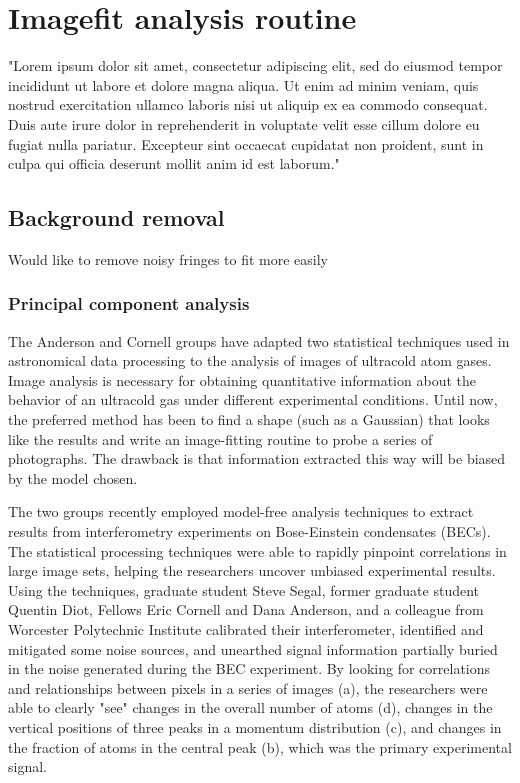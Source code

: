 \chapter{Imagefit analysis routine}
"Lorem ipsum dolor sit amet, consectetur adipiscing elit, sed do eiusmod tempor incididunt ut labore et dolore magna aliqua. Ut enim ad minim veniam, quis nostrud exercitation ullamco laboris nisi ut aliquip ex ea commodo consequat. Duis aute irure dolor in reprehenderit in voluptate velit esse cillum dolore eu fugiat nulla pariatur. Excepteur sint occaecat cupidatat non proident, sunt in culpa qui officia deserunt mollit anim id est laborum."

\section{Background removal}
Would like to remove noisy fringes to fit more easily

\subsection{Principal component analysis}

The Anderson and Cornell groups have adapted two statistical techniques used in astronomical data processing to the analysis of images of ultracold atom gases. Image analysis is necessary for obtaining quantitative information about the behavior of an ultracold gas under different experimental conditions. Until now, the preferred method has been to find a shape (such as a Gaussian) that looks like the results and write an image-fitting routine to probe a series of photographs. The drawback is that information extracted this way will be biased by the model chosen.

The two groups recently employed model-free analysis techniques to extract results from interferometry experiments on Bose-Einstein condensates (BECs). The statistical processing techniques were able to rapidly pinpoint correlations in large image sets, helping the researchers uncover unbiased experimental results. Using the techniques, graduate student Steve Segal, former graduate student Quentin Diot, Fellows Eric Cornell and Dana Anderson, and a colleague from Worcester Polytechnic Institute calibrated their interferometer, identified and mitigated some noise sources, and unearthed signal information partially buried in the noise generated during the BEC experiment. By looking for correlations and relationships between pixels in a series of images (a), the researchers were able to clearly "see" changes in the overall number of atoms (d), changes in the vertical positions of three peaks in a momentum distribution (c), and changes in the fraction of atoms in the central peak (b), which was the primary experimental signal.

